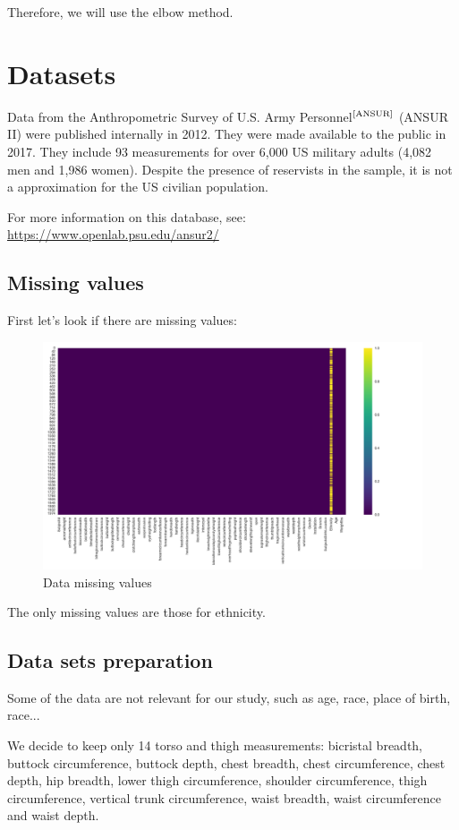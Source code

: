 \documentclass[12pt,a4paper,openany,UKenglish]{scrreprt}
\newcommand{\bib}[1]{$^\text{\cite{#1}}$}
\begin{document}
Therefore, we will use the elbow method.

\section{Datasets}
Data from the Anthropometric Survey of U.S. Army Personnel\bib{ANSUR} (ANSUR II) were published internally in 2012.
They were made available to the public in 2017.
They include 93 measurements for over 6,000 US military adults (4,082 men and 1,986 women).
Despite the presence of reservists in the sample, it is not a approximation for the US civilian population.

For more information on this database, see: \url{https://www.openlab.psu.edu/ansur2/}

\subsection{Missing values}
First let's look if there are missing values:
\begin{figure}[H]
	\centering
	\caption{Data missing values}
	\includegraphics[width=\textwidth, height=0.4\textheight]{../Images/Missing_Values.png}
\end{figure}
The only missing values are those for ethnicity.

\subsection{Data sets preparation}
Some of the data are not relevant for our study, such as age, race, place of birth, race...

We decide to keep only 14 torso and thigh measurements: bicristal breadth, buttock circumference, buttock depth, chest breadth, chest circumference, chest depth, hip breadth, lower thigh circumference, shoulder circumference, thigh circumference, vertical trunk circumference, waist breadth, waist circumference and waist depth.
\end{document}
